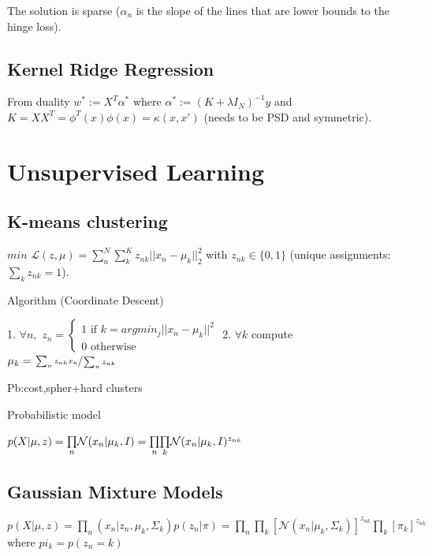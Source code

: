 The solution is sparse ($\alpha_n$ is the slope of the lines that are lower bounds to the hinge loss).

\subsection{Kernel Ridge Regression}
From duality $w^* := X^T \alpha^*$ where $\alpha^* := (K + \lambda I_N)^{-1}y$ and $K=XX^T = \phi^T(x) \phi(x) = \kappa(x,x')$ (needs to be PSD and symmetric).


\section{Unsupervised Learning}
\subsection{K-means clustering}

$min\,\,\mathcal{L}(z,\mu) = \sum_n^N \sum_k^K z_{nk} ||x_n - \mu_k||^2_2$ with $z_{nk} \in \{0,1\}$ (unique assignments: $\sum_k z_{nk} = 1$).

Algorithm (Coordinate Descent)

1. $\forall n,$ $z_n = \begin{cases}
	1 \text{ if } k = argmin_j || x_n - \mu_k||^2 \\
	0 \text{ otherwise }
   \end{cases}$
2. $\forall k$ compute $\mu_k = \sfrac{\sum_n z_{nk} x_n}{\sum_n z_{nk}}$

Pb:cost,spher+hard clusters

Probabilistic model

$p(X|\mu,z) = \underset{n}{\prod}  \mathcal{N}(x_n|\mu_k,I) \newline= \underset{n}{\prod} \underset{k}{\prod}  \mathcal{N}(x_n|\mu_k,I)^{z_{nk}}$

\subsection{Gaussian Mixture Models}
$p(X|\mu,z) = \underset{n}{\prod} (x_n|z_n,\mu_k,\Sigma_k)p(z_n|\pi)
= \underset{n}{\prod}\underset{k}{\prod} [\mathcal{N}(x_n|\mu_k,\Sigma_k)]^{z_{nk}} \underset{k}{\prod} [\pi_k]^{z_{nk}}$ \newline where $pi_k = p(z_n=k)$

